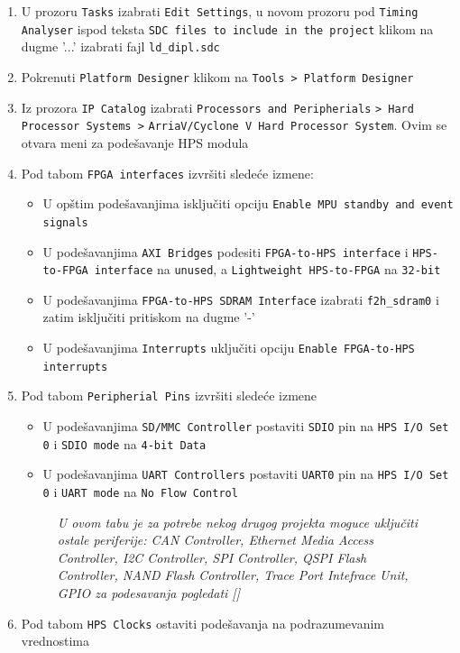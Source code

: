 \begin{enumerate}
\item U prozoru \texttt{Tasks} izabrati \texttt{Edit Settings}, u novom prozoru pod \texttt{Timing Analyser} ispod teksta \texttt{SDC files to include in the project} klikom na dugme '...' izabrati fajl \texttt{ld\_dipl.sdc}
\item  Pokrenuti \texttt{Platform Designer} klikom na \texttt{Tools > Platform Designer}
\item  Iz prozora \texttt{IP Catalog} izabrati \texttt{Processors and Peripherials} \texttt{> Hard Processor Systems >} \texttt{ArriaV/Cyclone V Hard Processor System}. Ovim se otvara meni za podešavanje HPS modula
\item  Pod tabom \texttt{FPGA interfaces} izvršiti sledeće izmene:
\begin{itemize}
\item	U opštim podešavanjima isključiti opciju \texttt{Enable MPU standby and event signals}
\item	U podešavanjima \texttt{AXI Bridges} podesiti \texttt{FPGA-to-HPS interface} i \texttt{HPS-to-FPGA interface} na \texttt{unused}, a \texttt{Lightweight HPS-to-FPGA} na \texttt{32-bit}
\item	U podešavanjima \texttt{FPGA-to-HPS SDRAM Interface} izabrati \texttt{f2h\_sdram0} i zatim isključiti pritiskom na dugme '-'
\item	U podešavanjima \texttt{Interrupts} uključiti opciju \texttt{Enable FPGA-to-HPS interrupts}
\end{itemize}
\item  Pod tabom \texttt{Peripherial Pins} izvršiti sledeće izmene
\begin{itemize}
\item	U podešavanjima \texttt{SD/MMC Controller} postaviti \texttt{SDIO} pin na \texttt{HPS I/O Set 0} i \texttt{SDIO mode} na \texttt{4-bit Data}
\item	U podešavanjima \texttt{UART Controllers} postaviti \texttt{UART0} pin na \texttt{HPS I/O Set 0} i \texttt{UART mode} na \texttt{No Flow Control}
\end{itemize}
	\begin{figure}[h!]
	\centering
	\textit{U ovom tabu je za potrebe nekog drugog projekta moguce uključiti ostale periferije: CAN Controller, Ethernet Media Access Controller, I2C Controller, SPI Controller, QSPI Flash Controller, NAND Flash Controller, Trace Port Intefrace Unit, GPIO za podesavanja pogledati []}
	\end{figure}
\item  Pod tabom \texttt{HPS Clocks} ostaviti podešavanja na podrazumevanim vrednostima

\end{enumerate}
